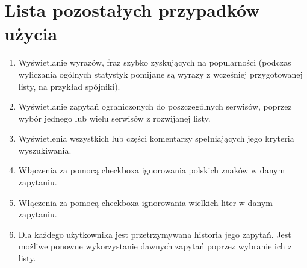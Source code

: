 \documentclass[a4paper]{article}
\begin{document}
\section{Lista pozostałych przypadków użycia}
\begin{enumerate}
	\item Wyświetlanie wyrazów, fraz szybko zyskujących na popularności (podczas wyliczania ogólnych statystyk pomijane są wyrazy z wcześniej przygotowanej listy, na przykład spójniki).
	\item Wyświetlanie zapytań ograniczonych do poszczególnych serwisów, poprzez wybór jednego lub wielu serwisów z rozwijanej listy.
	\item Wyświetlenia wszystkich lub części komentarzy spełniających jego kryteria wyszukiwania.
    \item Włączenia za pomocą checkboxa ignorowania polskich znaków w danym zapytaniu.
    \item Włączenia za pomocą checkboxa ignorowania wielkich liter w danym zapytaniu.
	\item Dla każdego użytkownika jest przetrzymywana historia jego zapytań. Jest możliwe ponowne wykorzystanie dawnych zapytań poprzez wybranie ich z listy.



\end{enumerate}
\end{document}
